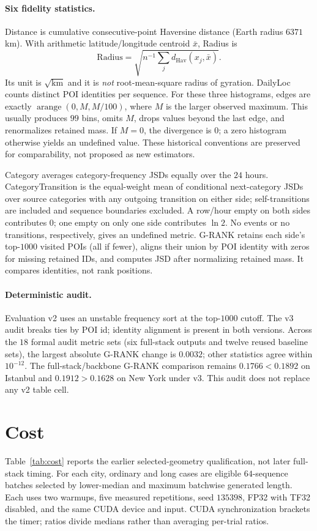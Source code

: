 \paragraph{Six fidelity statistics.}
Distance is cumulative consecutive-point Haversine distance (Earth radius
$6371$ km). With arithmetic latitude/longitude centroid $\bar x$, Radius is
\[
  \mathrm{Radius}=\sqrt{n^{-1}\sum_j d_{\mathrm{Hav}}(x_j,\bar x)}.
\]
Its unit is $\sqrt{\mathrm{km}}$ and it
is \emph{not} root-mean-square radius of gyration.
DailyLoc counts distinct POI identities per sequence.
For these three histograms, edges are exactly
$\operatorname{arange}(0,M,M/100)$, where $M$ is the larger observed maximum.
This usually produces $99$ bins, omits $M$, drops values beyond the last edge,
and renormalizes retained mass. If $M=0$, the divergence is $0$; a zero
histogram otherwise yields an undefined value. These historical conventions
are preserved for comparability, not proposed as new estimators.

Category averages category-frequency JSDs equally over the $24$ hours.
CategoryTransition is the equal-weight mean of conditional next-category
JSDs over source categories with any outgoing transition on either side;
self-transitions are included and sequence boundaries excluded. A row/hour
empty on both sides contributes $0$; one empty on only one side contributes
$\ln2$. No events or no transitions, respectively, gives an undefined metric.
G-RANK retains each side's top-$1000$ visited POIs (all if fewer), aligns
their union by POI identity with zeros for missing retained IDs, and computes
JSD after normalizing retained mass. It compares identities, not rank positions.

\paragraph{Deterministic audit.}
Evaluation v2 uses an unstable frequency sort at the top-$1000$ cutoff.
The v3 audit breaks ties by POI id; identity alignment is present in both
versions. Across the $18$ formal audit metric sets (six full-stack outputs
and twelve reused baseline sets), the largest absolute G-RANK change is
$0.0032$; other statistics agree within $10^{-12}$.
The full-stack/backbone G-RANK comparison remains $0.1766<0.1892$ on
Istanbul and $0.1912>0.1628$ on New York under v3.
This audit does not replace any v2 table cell.

\section{Cost}
\label{app:cost}
Table~\ref{tab:cost} reports the earlier selected-geometry qualification, not
later full-stack timing. For each city, ordinary and long cases are eligible
$64$-sequence batches selected by lower-median and maximum batchwise generated
length. Each uses two warmups, five measured repetitions, seed $135398$, FP32
with TF32 disabled, and the same CUDA device and input. CUDA synchronization
brackets the timer; ratios divide medians rather than averaging per-trial ratios.


